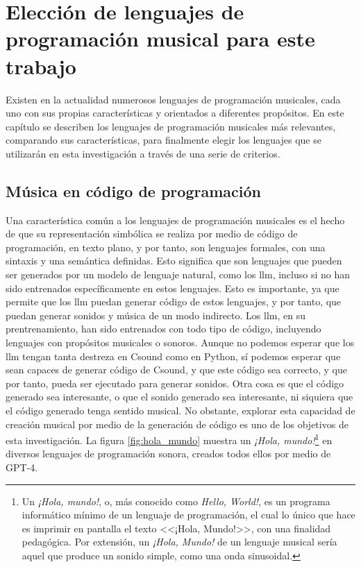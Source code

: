 \chapter{Elección de lenguajes de programación musical para este trabajo}
\label{chap:lenguajes}


Existen en la actualidad numerosos lenguajes de programación musicales, cada uno con sus propias características y orientados a diferentes propósitos. En este capítulo se describen los lenguajes de programación musicales más relevantes, comparando sus características, para finalmente elegir los lenguajes que se utilizarán en esta investigación a través de una serie de criterios.

\section{Música en código de programación}

Una característica común a los lenguajes de programación musicales es el hecho de que su representación simbólica se realiza por medio de código de programación, en texto plano, y por tanto, son lenguajes formales, con una sintaxis y una semántica definidas. Esto significa que son lenguajes que pueden ser generados por un modelo de lenguaje natural, como los \gls{llm}, incluso si no han sido entrenados específicamente en estos lenguajes. Esto es importante, ya que permite que los \gls{llm} puedan generar código de estos lenguajes, y por tanto, que puedan generar sonidos y música de un modo indirecto. Los \gls{llm}, en su prentrenamiento, han sido entrenados con todo tipo de código, incluyendo lenguajes con propósitos musicales o sonoros. Aunque no podemos esperar que los \gls{llm} tengan tanta destreza en Csound como en Python, sí podemos esperar que sean capaces de generar código de Csound, y que este código sea correcto, y que por tanto, pueda ser ejecutado para generar sonidos. Otra cosa es que el código generado sea interesante, o que el sonido generado sea interesante, ni siquiera que el código generado tenga sentido musical. No obstante, explorar esta capacidad de creación musical por medio de la generación de código es uno de los objetivos de esta investigación. La figura \ref{fig:hola_mundo} muestra un \emph{¡Hola, mundo!}\footnote{Un \emph{¡Hola, mundo!}, o, más conocido como \emph{Hello, World!}, es un programa informático mínimo de un lenguaje de programación, el cual lo único que hace es imprimir en pantalla el texto <<¡Hola, Mundo!>>, con una finalidad pedagógica. Por extensión, un \emph{¡Hola, Mundo!} de un lenguaje musical sería aquel que produce un sonido simple, como una onda sinusoidal.} en diversos lenguajes de programación sonora, creados todos ellos por medio de GPT-4.

